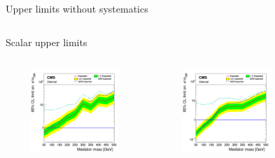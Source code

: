 \documentclass[8pt]{beamer}
\begin{document}
\begin{frame}{Upper limits without systematics}
\begin{columns}
\begin{column}{1.09\textwidth}
\begin{block}{\centering Scalar upper limits}\end{block}
\end{column}
\end{columns} \vspace{-5pt}
\begin{columns}
		\begin{column}{0.33\textwidth}
			\begin{center}
			\vspace{-8pt}
			\begin{block}{}\end{block} \vspace{-10pt}
     			\includegraphics[width=1.0\textwidth, height=90pt]{figs/limit_scalar2016.png}
    		\end{center}		
		\end{column} 
		\begin{column}{0.33\textwidth}
			\begin{center}
			\vspace{-8pt}
			\begin{block}{}\end{block} \vspace{-10pt}
     			\includegraphics[width=1.0\textwidth, height=90pt]{figs/limit_scalar2017.png}
    		\end{center}		
		\end{column} 
		\begin{column}{0.33\textwidth}
			\begin{center}
			\vspace{-8pt}
			\begin{block}{}\end{block} \vspace{-10pt}

\end{center}
\end{column}
\end{columns}
\end{frame}
\end{document}
